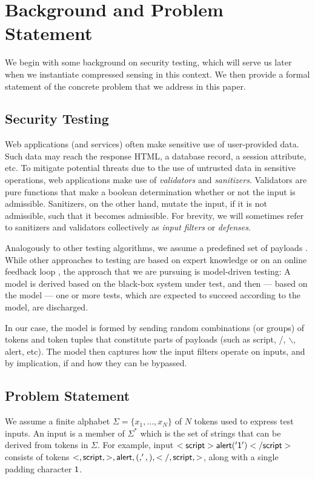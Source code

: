 \section{Background and Problem Statement}

We begin with some background on security testing, which will serve us later when we instantiate compressed sensing in this context. We then provide a formal statement of the concrete problem that we address in this paper.

\subsection{Security Testing}

Web applications (and services) often make sensitive use of user-provided data. Such data may reach the response HTML, a database record, a session attribute, etc. To mitigate potential threats due to the use of untrusted data in sensitive operations, web applications make use of \emph{validators} and \emph{sanitizers}. Validators are pure functions that make a boolean determination whether or not the input is admissible. Sanitizers, on the other hand, mutate the input, if it is not admissible, such that it becomes admissible. For brevity, we will sometimes refer to sanitizers and validators collectively as \emph{input filters} or \emph{defenses}.

Analogously to other testing algorithms, we assume a predefined set of payloads \cite{TrippIssta:2013,AppScanStd}. While other approaches to testing are based on expert knowledge \cite{AppScanStd} or on an online feedback loop \cite{TrippIssta:2013}, the approach that we are pursuing is model-driven testing: A model is derived based on the black-box system under test, and then --- based on the model --- one or more tests, which are expected to succeed according to the model, are discharged.

In our case, the model is formed by sending random combinations (or groups) of tokens and token tuples that constitute parts of payloads (such as {\sf script}, {\sf /}, {\sf $\backslash$}, {\sf alert}, etc). The model then captures how the input filters operate on inputs, and by implication, if and how they can be bypassed.

\subsection{Problem Statement}

We assume a finite alphabet $\Sigma=\{x_1,\ldots,x_N\}$ of $N$ tokens used to express test inputs. An input is a member of $\Sigma^{*}$ which is the set of strings that can be derived from tokens in $\Sigma$. For example, input ${\sf <script>alert('1')</script>}$ consists of tokens ${\sf <,script,>,alert,(,',),</,script,>}$, along with a single  padding character $\sf{1}$.

